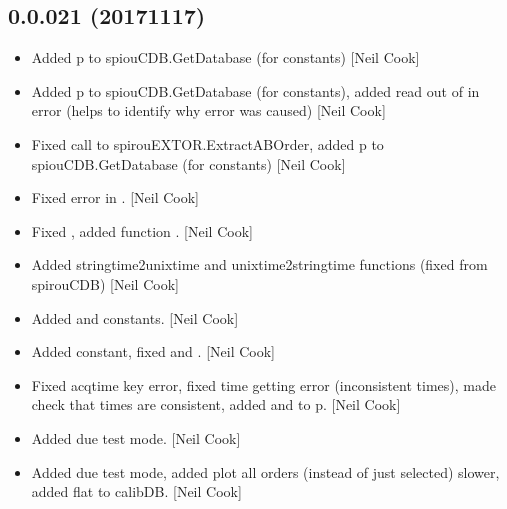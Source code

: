 \documentclass[a4paper,10pt,english]{report}
\begin{document}
\subsection{0.0.021 (2017\sphinxhyphen{}11\sphinxhyphen{}17)}
\label{\detokenize{misc/changelog:id548}}\begin{itemize}
\item {} 
Added p to spiouCDB.GetDatabase (for  constants) {[}Neil Cook{]}

\item {} 
Added p to spiouCDB.GetDatabase (for  constants), added read
out of  in error (helps to identify why error was caused)
{[}Neil Cook{]}

\item {} 
Fixed call to spirouEXTOR.ExtractABOrder, added p to
spiouCDB.GetDatabase (for  constants) {[}Neil Cook{]}

\item {} 
Fixed error in . {[}Neil Cook{]}

\item {} 
Fixed , added function
. {[}Neil Cook{]}

\item {} 
Added stringtime2unixtime and unixtime2stringtime functions (fixed
from spirouCDB) {[}Neil Cook{]}

\item {} 
Added  and  constants. {[}Neil Cook{]}

\item {} 
Added  constant, fixed  and
. {[}Neil Cook{]}

\item {} 
Fixed acqtime key error, fixed time getting error (inconsistent
times), made check that times are consistent, added  and
 to p. {[}Neil Cook{]}

\item {} 
Added due test mode. {[}Neil Cook{]}

\item {} 
Added due test mode, added plot all orders (instead of just selected)
\sphinxhyphen{} slower, added flat to calibDB. {[}Neil Cook{]}


\end{itemize}
\end{document}
